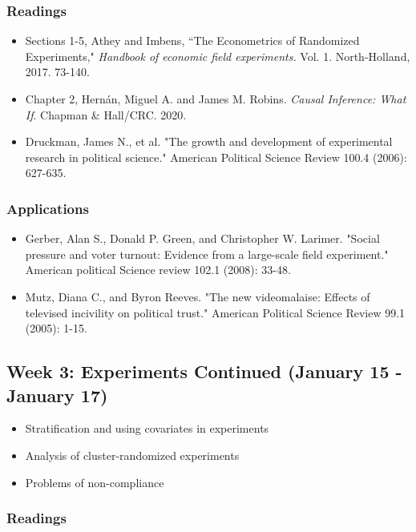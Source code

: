 \documentclass[11pt, article, oneside]{memoir}
\theoremstyle{Assumption}
\begin{document}
\subsubsection*{Readings}

\begin{itemize}
\item Sections 1-5, Athey and Imbens, ``The Econometrics of Randomized Experiments,"  \textit{Handbook of economic field experiments.} Vol. 1. North-Holland, 2017. 73-140. 
\item Chapter 2, Hern\'an, Miguel A. and  James M. Robins. \textit{Causal Inference: What If}.  Chapman \& Hall/CRC. 2020.
\item Druckman, James N., et al. "The growth and development of experimental research in political science." American Political Science Review 100.4 (2006): 627-635.
\end{itemize}

\subsubsection*{Applications}

\begin{itemize}
\item Gerber, Alan S., Donald P. Green, and Christopher W. Larimer. "Social pressure and voter turnout: Evidence from a large-scale field experiment." American political Science review 102.1 (2008): 33-48.
\item Mutz, Diana C., and Byron Reeves. "The new videomalaise: Effects of televised incivility on political trust." American Political Science Review 99.1 (2005): 1-15.
\end{itemize}

\subsection{Week 3: Experiments Continued (January 15 - January 17)}

\begin{itemize}
\item Stratification and using covariates in experiments
\item Analysis of cluster-randomized experiments
\item Problems of non-compliance
\end{itemize}

\subsubsection*{Readings}
\end{document}
